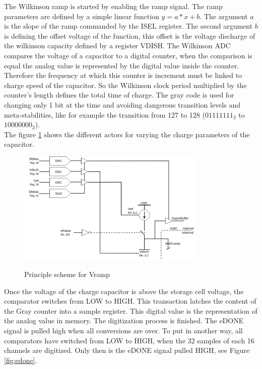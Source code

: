 \noindent
The Wilkinson ramp is started by enabling the ramp signal. The ramp parameters are defined by a simple linear function $y = a*x+b$. The argument $a$ is the slope of the ramp commanded by the ISEL register. The second argument $b$ is defining the offset voltage of the function, this offset is the voltage discharge of the wilkinson capacity defined by a register VDISH. The Wilkinson ADC compares the voltage of a capacitor to a digital counter, when the comparison is equal the analog value is represented by the digital value inside the counter. Therefore the frequency at which this counter is increment must be linked to charge speed of the capacitor. So the Wilkinson clock period multiplied by the counter's length defines the total time of charge. The gray code is used for changing only 1 bit at the time and avoiding dangerous transition levels and meta-stabilities, like for example the transition from 127 to 128 ($01111111_{2}$ to $10000000_{2}$).\\The figure \ref{fig:vramp} shows the different actors for varying the charge parameters of the capacitor.

\begin{figure}[H]
\centering
\includegraphics[width=0.8\textwidth]{figures/vramp.png}\\
\caption{\label{fig:vramp} Principle scheme for Vramp}
\end{figure}

\noindent
Once the voltage of the charge capacitor is above the storage cell voltage, the comparator switches from LOW to HIGH. This transaction latches the content of the Gray counter into a sample register. This digital value is the representation of the analog value in memory. The digitization process is finished. The eDONE signal is pulled high when all conversions are over. To put in another way, all comparators have switched from LOW to HIGH, when the 32 samples of each 16 channels are digitized. Only then is the eDONE signal pulled HIGH, see Figure \ref{fig:edone}. \\

